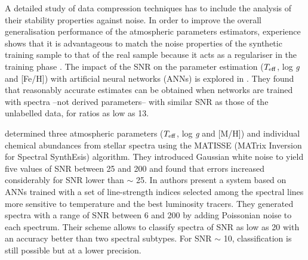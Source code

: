 \documentclass[a4paper,fleqn,usenatbib]{mnras}
\begin{document}
A detailed study of data compression techniques has to include the
analysis of their stability properties against noise. In order to
improve the overall generalisation performance of the atmospheric
parameters estimators, experience shows that it is advantageous to
match the noise properties of the synthetic training sample to that of
the real sample because it acts as a regulariser in the training phase
\citep{fiorentin:08a}.  The impact of the SNR on the parameter
estimation ($T_{\rm eff}$, log \textit{g} and [Fe/H]) with artificial
neural networks (ANNs) is explored in \cite{snider:01}. They found
that reasonably accurate estimates can be obtained when networks are
trained with spectra --not derived parameters-- with similar SNR as
those of the unlabelled data, for ratios as low as 13.

\cite{recio:06} determined three atmospheric parameters
($T_{\rm eff}$, log \textit{g} and [M/H]) and individual chemical
abundances from stellar spectra using the MATISSE (MATrix
Inversion for Spectral SynthEsis) algorithm. They introduced Gaussian
white noise to yield five values of SNR between 25 and 200 and found
that errors increased considerably for SNR lower than $\sim$ 25.  In
\cite{navarro:12} authors present a system based on ANNs trained with
a set of line-strength indices selected among the spectral lines more
sensitive to temperature and the best luminosity tracers. They
generated spectra with a range of SNR between 6 and 200 by adding
Poissonian noise to each spectrum. Their scheme allows to classify
spectra of SNR as low as 20 with an accuracy better than two spectral
subtypes. For SNR $\sim$ 10, classification is still possible but at a
lower precision.
\end{document}
